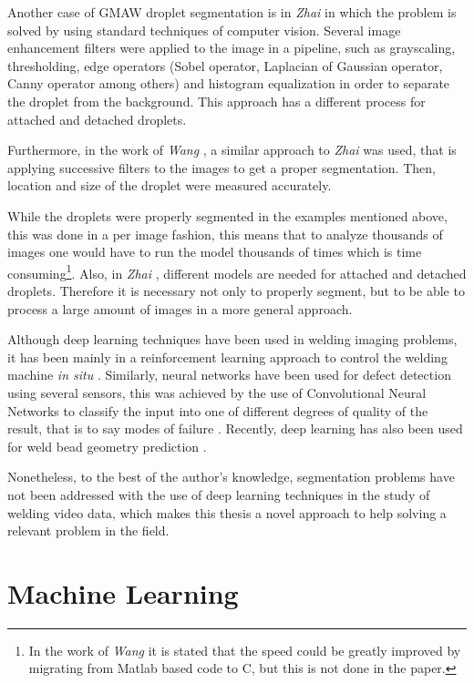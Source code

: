 Another case of GMAW droplet segmentation is in \textit{Zhai} \cite{Zhai} in which the problem is solved by using standard techniques of computer vision. Several image enhancement filters were applied to the image in a pipeline, such as grayscaling, thresholding, edge operators (Sobel operator, Laplacian of Gaussian operator, Canny operator among others) and histogram equalization in order to separate the droplet from the background. This approach has a different process for attached and detached droplets. 

Furthermore, in the work of \textit{Wang} \cite{wang}, a similar approach to \textit{Zhai} \cite{Zhai} was used, that is applying successive filters to the images to get a proper segmentation. Then, location and size of the droplet were measured accurately.

While the droplets were properly segmented in the examples mentioned above, this was done in a per image fashion, this means that to analyze thousands of images one would have to run the model thousands of times which is time consuming\footnote{In the work of \textit{Wang} \cite{wang} it is stated that the speed could be greatly improved by migrating from Matlab based code to C, but this is not done in the paper.}. Also, in \textit{Zhai} \cite{Zhai}, different models are needed for attached and detached droplets. Therefore it is necessary not only to properly segment, but to be able to process a large amount of images in a more general approach.

Although deep learning techniques have been used in welding imaging problems, it has been mainly in a reinforcement learning approach to control the welding machine \textit{in situ} \cite{Gunther}. Similarly, neural networks have been used for defect detection using several sensors, this was achieved by the use of Convolutional Neural Networks to classify the input into one of different degrees of quality of the result, that is to say modes of failure \cite{Zhang}. Recently, deep learning has also been used for weld bead geometry prediction \cite{bead}.

Nonetheless, to the best of the author's knowledge, segmentation problems have not been addressed with the use of deep learning techniques in the study of welding video data, which makes this thesis a novel approach to help solving a relevant problem in the field.

\section{Machine Learning}

